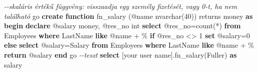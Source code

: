 \documentclass[
  magyar,
]{article}
\newenvironment{Shaded}{}{}
\newcommand{\CommentTok}[1]{\textcolor[rgb]{0.38,0.63,0.69}{\textit{#1}}}
\newcommand{\ControlFlowTok}[1]{\textcolor[rgb]{0.00,0.44,0.13}{\textbf{#1}}}
\newcommand{\DataTypeTok}[1]{\textcolor[rgb]{0.56,0.13,0.00}{#1}}
\newcommand{\DecValTok}[1]{\textcolor[rgb]{0.25,0.63,0.44}{#1}}
\newcommand{\FunctionTok}[1]{\textcolor[rgb]{0.02,0.16,0.49}{#1}}
\newcommand{\KeywordTok}[1]{\textcolor[rgb]{0.00,0.44,0.13}{\textbf{#1}}}
\newcommand{\NormalTok}[1]{#1}
\newcommand{\OperatorTok}[1]{\textcolor[rgb]{0.40,0.40,0.40}{#1}}
\newcommand{\StringTok}[1]{\textcolor[rgb]{0.25,0.44,0.63}{#1}}
\begin{document}
\begin{Shaded}
\begin{Highlighting}[]
\CommentTok{{-}{-}skaláris értékű függvény: visszaadja egy személy fizetését, vagy 0{-}t, ha nem található}
\NormalTok{go}
\KeywordTok{create} \KeywordTok{function}\NormalTok{ fn\_salary (@name }\DataTypeTok{nvarchar}\NormalTok{(}\DecValTok{40}\NormalTok{)) returns money }\KeywordTok{as}
\ControlFlowTok{begin}
    \KeywordTok{declare}\NormalTok{ @salary money, @res\_no }\DataTypeTok{int}
    \KeywordTok{select}\NormalTok{ @res\_no}\OperatorTok{=}\FunctionTok{count}\NormalTok{(}\OperatorTok{*}\NormalTok{) }\KeywordTok{from}\NormalTok{ Employees }\KeywordTok{where}\NormalTok{ LastName }\KeywordTok{like}\NormalTok{ @name }\OperatorTok{+} \StringTok{\textquotesingle{}\%\textquotesingle{}}
    \ControlFlowTok{if}\NormalTok{ @res\_no }\OperatorTok{\textless{}\textgreater{}} \DecValTok{1} \KeywordTok{set}\NormalTok{ @salary}\OperatorTok{=}\DecValTok{0}
    \ControlFlowTok{else} \KeywordTok{select}\NormalTok{ @salary}\OperatorTok{=}\NormalTok{Salary }\KeywordTok{from}\NormalTok{ Employees }\KeywordTok{where}\NormalTok{ LastName }\KeywordTok{like}\NormalTok{ @name }\OperatorTok{+} \StringTok{\textquotesingle{}\%\textquotesingle{}}
    \KeywordTok{return}\NormalTok{ @salary}
\ControlFlowTok{end}
\NormalTok{go}
\CommentTok{{-}{-}teszt}
\KeywordTok{select}\NormalTok{ [your }\FunctionTok{user}\NormalTok{ name].fn\_salary(}\StringTok{\textquotesingle{}Fuller\textquotesingle{}}\NormalTok{) }\KeywordTok{as}\NormalTok{ salary}
\end{Highlighting}
\end{Shaded}
\end{document}
